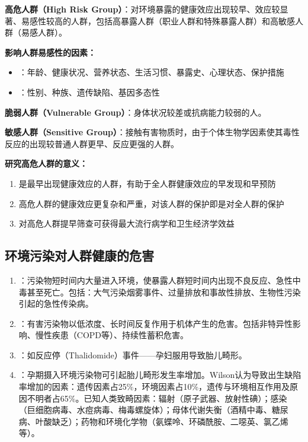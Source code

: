 \documentclass[10pt,a4paper,oneside]{ctexbook}
\begin{document}
\begin{defbox}
\textbf{高危人群（High Risk Group）}：对环境暴露的健康效应出现较早、效应较显著、易感性较高的人群，包括高暴露人群（职业人群和特殊暴露人群）和高敏感人群（易感人群）。

\textbf{影响人群易感性的因素：}
\begin{itemize}[leftmargin=*]
    \item {}：年龄、健康状况、营养状态、生活习惯、暴露史、心理状态、保护措施
    \item {}：性别、种族、遗传缺陷、基因多态性
\end{itemize}

\textbf{脆弱人群（Vulnerable Group）}：身体状况较差或抗病能力较弱的人。

\textbf{敏感人群（Sensitive Group）}：接触有害物质时，由于个体生物学因素使其毒性反应的出现较普通人群更早、反应更强的人群。
\end{defbox}

\begin{tipbox}
\textbf{研究高危人群的意义：}
\begin{enumerate}[leftmargin=*]
    \item 是最早出现健康效应的人群，有助于全人群健康效应的早发现和早预防
    \item 高危人群的健康效应更复杂和严重，对该人群的保护即是对全人群的保护
    \item 对高危人群提早筛查可获得最大流行病学和卫生经济学效益
\end{enumerate}
\end{tipbox}

\subsection{环境污染对人群健康的危害}

\begin{enumerate}[leftmargin=*]
    \item {}：污染物短时间内大量进入环境，使暴露人群短时间内出现不良反应、急性中毒甚至死亡。包括：大气污染烟雾事件、过量排放和事故性排放、生物性污染引起的急性传染病。
    \item {}：有害污染物以低浓度、长时间反复作用于机体产生的危害。包括非特异性影响、慢性疾患（COPD等）、持续性蓄积危害。
    \item {}：如反应停（Thalidomide）事件——孕妇服用导致胎儿畸形。
    \item {}：孕期摄入环境污染物可引起胎儿畸形发生率增加。Wilson认为导致出生缺陷率增加的因素：遗传因素占25\%，环境因素占10\%，遗传与环境相互作用及原因不明者占65\%。已知人类致畸因素：辐射（原子武器、放射性碘）；感染（巨细胞病毒、水痘病毒、梅毒螺旋体）；母体代谢失衡（酒精中毒、糖尿病、叶酸缺乏）；药物和环境化学物（氨蝶呤、环磷酰胺、二噁英、氯乙烯等）。
\end{enumerate}
\end{document}
